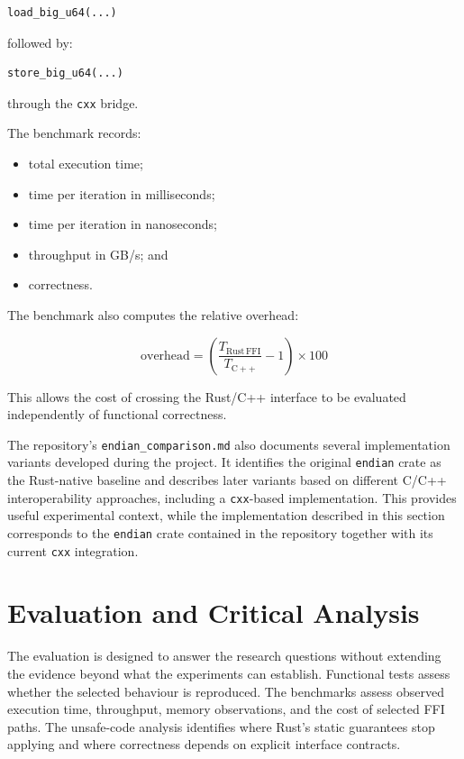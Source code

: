 \begin{lstlisting}[style=rustblock]
load_big_u64(...)
\end{lstlisting}

followed by:

\begin{lstlisting}[style=rustblock]
store_big_u64(...)
\end{lstlisting}

through the \texttt{cxx} bridge.

The benchmark records:

\begin{itemize}
\item total execution time;
\item time per iteration in milliseconds;
\item time per iteration in nanoseconds;
\item throughput in GB/s; and
\item correctness.
\end{itemize}

The benchmark also computes the relative overhead:

$$
\text{overhead} =
\left(
\frac{T_{\mathrm{Rust\,FFI}}}
     {T_{\mathrm{C++}}}
-1
\right)\times100
$$

This allows the cost of crossing the Rust/C++ interface to be evaluated independently of functional correctness.

The repository's \texttt{endian\_comparison.md} also documents several implementation variants developed during the project. 
It identifies the original \texttt{endian} crate as the Rust-native baseline and describes later variants based on different C/C++ 
interoperability approaches, including a \texttt{cxx}-based implementation. This provides useful experimental context, 
while the implementation described in this section corresponds to the \texttt{endian} crate contained in the repository together with 
its current \texttt{cxx} integration.

\section{Evaluation and Critical Analysis}
\label{sec:evaluation_critical_analysis}

The evaluation is designed to answer the research questions without extending the evidence beyond what the experiments can establish. Functional tests assess whether the selected behaviour is reproduced. The benchmarks assess observed execution time, throughput, memory observations, and the cost of selected FFI paths. The unsafe-code analysis identifies where Rust's static guarantees stop applying and where correctness depends on explicit interface contracts.

